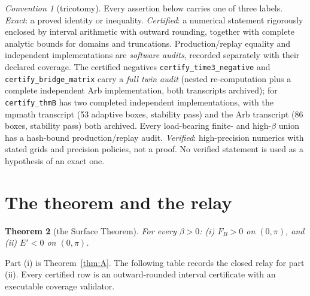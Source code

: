 \documentclass[11pt]{article}
\newtheorem{theorem}{Theorem}
\theoremstyle{remark}
\newtheorem{convention}[theorem]{Convention}
\newcommand{\FB}{F_{\!B}}
\begin{document}
\begin{convention}[tricotomy]\label{conv:tri}
Every assertion below carries one of three labels. \emph{Exact}: a
proved identity or inequality. \emph{Certified}: a numerical statement
rigorously enclosed by interval arithmetic with outward rounding,
together with complete analytic bounds for domains and truncations.
Production/replay equality and independent implementations are
\emph{software audits}, recorded separately with their declared
coverage.  The certified negatives
\texttt{certify\_time3\_negative} and \texttt{certify\_bridge\_matrix}
carry a \emph{full twin audit} (nested re-computation plus a complete
independent Arb implementation, both transcripts archived); for
\texttt{certify\_thmB} has two completed independent implementations,
with the mpmath transcript (53 adaptive boxes, stability pass) and the Arb
transcript (86 boxes, stability pass) both archived.  Every load-bearing
finite- and high-$\beta$ union has a hash-bound production/replay audit.
\emph{Verified}: high-precision
numerics with stated grids and precision policies, not a proof. No
verified statement is used as a hypothesis of an exact one.
\end{convention}

\section{The theorem and the relay}\label{sec:relay}

\begin{theorem}[the Surface Theorem]
\label{thm:main}
For every $\beta>0$: \textup{(i)} $\FB>0$ on $(0,\pi)$, and
\textup{(ii)} $E'<0$ on $(0,\pi)$.
\end{theorem}

Part (i) is Theorem~\ref{thm:A}.  The following table records the closed
relay for part (ii).  Every certified row is an outward-rounded interval
certificate with an executable coverage validator.
\end{document}
